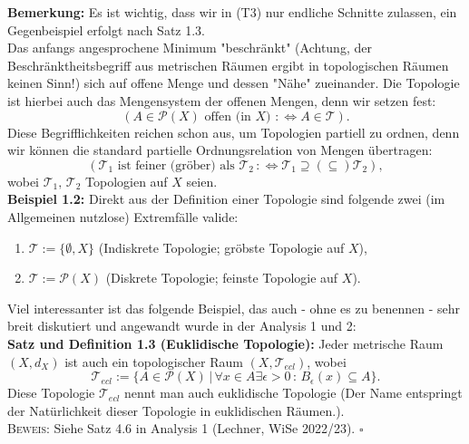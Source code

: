 \documentclass[11pt,english]{smfart}
\newcommand*{\QEDB}{\null\nobreak\hfill\ensuremath{\square}}
\begin{document}
\textbf{Bemerkung:} Es ist wichtig, dass wir in (T3) nur endliche Schnitte zulassen, ein Gegenbeispiel erfolgt nach Satz 1.3.\\

Das anfangs angesprochene Minimum "beschränkt" (Achtung, der Beschränktheitsbegriff aus metrischen Räumen ergibt in topologischen Räumen keinen Sinn!) sich auf offene Menge und dessen "Nähe" zueinander. Die Topologie ist hierbei auch das Mengensystem der offenen Mengen, denn wir setzen fest:
\begin{equation}
    (A \in \mathcal{P}(X) \text{ offen (in }X \text{) } :\Leftrightarrow A \in \mathcal{T}).
\end{equation}
Diese Begrifflichkeiten reichen schon aus, um Topologien partiell zu ordnen, denn wir können die standard partielle Ordnungsrelation von Mengen übertragen:
\begin{equation}
    (\mathcal{T}_1 \text{ ist feiner (gröber) als }\mathcal{T}_2 \, :\Leftrightarrow \mathcal{T}_1 \supseteq (\subseteq) \mathcal{T}_2),
\end{equation}
wobei \(\mathcal{T}_1, \, \mathcal{T}_2\) Topologien auf \(X\) seien.\\[0.5cm]
\textbf{Beispiel 1.2:} Direkt aus der Definition einer Topologie sind folgende zwei (im Allgemeinen nutzlose) Extremfälle valide:
\begin{enumerate}
    \item \(\mathcal{T} := \{\emptyset,X\}\) (Indiskrete Topologie; gröbste Topologie auf \(X\)),
    \item \(\mathcal{T} := \mathcal{P}(X)\) (Diskrete Topologie; feinste Topologie auf \(X\)).
\end{enumerate}

Viel interessanter ist das folgende Beispiel, das auch - ohne es zu benennen - sehr breit diskutiert und angewandt wurde in der Analysis 1 und 2:\\[0.5cm]
\textbf{Satz und Definition 1.3 (Euklidische Topologie):} Jeder metrische Raum \((X,d_{X})\) ist auch ein topologischer Raum \((X,\mathcal{T}_{ecl})\), wobei
\begin{equation}
    \mathcal{T}_{ecl} := \{A \in \mathcal{P}(X) \, | \, \forall x \in A \exists \epsilon > 0 \, : \, B_{\epsilon}(x) \subseteq A\}.
\end{equation}
Diese Topologie \(\mathcal{T}_{ecl}\) nennt man auch euklidische Topologie (Der Name entspringt der Natürlichkeit dieser Topologie in euklidischen Räumen.).\\[0.5cm]
\textsc{Beweis:} Siehe Satz 4.6 in Analysis 1 (Lechner, WiSe 2022/23). \QEDB
\end{document}
